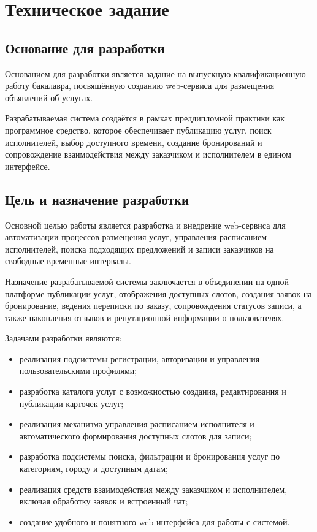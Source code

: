 \section{Техническое задание}

\subsection{Основание для разработки}

Основанием для разработки является задание на выпускную квалификационную работу бакалавра, посвящённую созданию web-сервиса для размещения объявлений об услугах.

Разрабатываемая система создаётся в рамках преддипломной практики как программное средство, которое обеспечивает публикацию услуг, поиск исполнителей, выбор доступного времени, создание бронирований и сопровождение взаимодействия между заказчиком и исполнителем в едином интерфейсе.

\subsection{Цель и назначение разработки}

Основной целью работы является разработка и внедрение web-сервиса для автоматизации процессов размещения услуг, управления расписанием исполнителей, поиска подходящих предложений и записи заказчиков на свободные временные интервалы.

Назначение разрабатываемой системы заключается в объединении на одной платформе публикации услуг, отображения доступных слотов, создания заявок на бронирование, ведения переписки по заказу, сопровождения статусов записи, а также накопления отзывов и репутационной информации о пользователях.

Задачами разработки являются:
\begin{itemize}
	\item реализация подсистемы регистрации, авторизации и управления пользовательскими профилями;
	\item разработка каталога услуг с возможностью создания, редактирования и публикации карточек услуг;
	\item реализация механизма управления расписанием исполнителя и автоматического формирования доступных слотов для записи;
	\item разработка подсистемы поиска, фильтрации и бронирования услуг по категориям, городу и доступным датам;
	\item реализация средств взаимодействия между заказчиком и исполнителем, включая обработку заявок и встроенный чат;
	\item создание удобного и понятного web-интерфейса для работы с системой.
\end{itemize}

